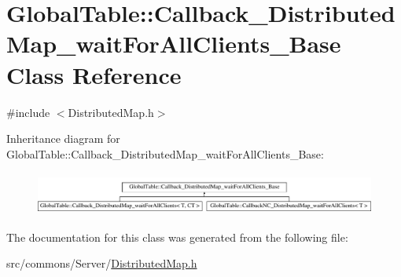 \hypertarget{class_global_table_1_1_callback___distributed_map__wait_for_all_clients___base}{
\section{GlobalTable::Callback\_\-DistributedMap\_\-waitForAllClients\_\-Base Class Reference}
\label{class_global_table_1_1_callback___distributed_map__wait_for_all_clients___base}
}


{\ttfamily \#include $<$DistributedMap.h$>$}

Inheritance diagram for GlobalTable::Callback\_\-DistributedMap\_\-waitForAllClients\_\-Base:\begin{figure}[H]
\begin{center}
\leavevmode
\includegraphics[height=1.42857cm]{class_global_table_1_1_callback___distributed_map__wait_for_all_clients___base}
\end{center}
\end{figure}


The documentation for this class was generated from the following file:\begin{DoxyCompactItemize}
\item 
src/commons/Server/\hyperlink{_distributed_map_8h}{DistributedMap.h}\end{DoxyCompactItemize}
